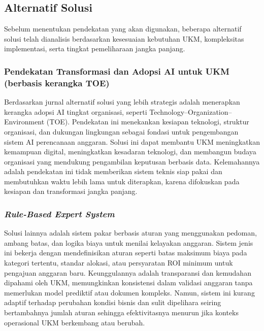 \subsection{Alternatif Solusi}
Sebelum menentukan pendekatan yang akan digunakan, beberapa alternatif solusi telah dianalisis berdasarkan kesesuaian kebutuhan UKM, kompleksitas implementasi, serta tingkat pemeliharaan jangka panjang.

\subsubsection{Pendekatan Transformasi dan Adopsi AI untuk UKM (berbasis kerangka TOE)}
Berdasarkan jurnal \textcite{Badghish2024} alternatif solusi yang lebih strategis adalah menerapkan kerangka adopsi AI tingkat organisasi, seperti Technology–Organization–Environment (TOE). Pendekatan ini menekankan kesiapan teknologi, struktur organisasi, dan dukungan lingkungan sebagai fondasi untuk pengembangan sistem AI perencanaan anggaran. Solusi ini dapat membantu UKM meningkatkan kemampuan digital, meningkatkan kesadaran teknologi, dan membangun budaya organisasi yang mendukung pengambilan keputusan berbasis data. Kelemahannya adalah pendekatan ini tidak memberikan sistem teknis siap pakai dan membutuhkan waktu lebih lama untuk diterapkan, karena difokuskan pada kesiapan dan transformasi jangka panjang.

\subsubsection{\textit{Rule-Based Expert System}}
Solusi lainnya adalah sistem pakar berbasis aturan yang menggunakan pedoman, ambang batas, dan logika biaya untuk menilai kelayakan anggaran. Sistem jenis ini bekerja dengan mendefinisikan aturan seperti batas maksimum biaya pada kategori tertentu, standar alokasi, atau persyaratan ROI minimum untuk pengajuan anggaran baru. Keunggulannya adalah transparansi dan kemudahan dipahami oleh UKM, memungkinkan konsistensi dalam validasi anggaran tanpa memerlukan model prediktif atau dokumen kompleks. Namun, sistem ini kurang adaptif terhadap perubahan kondisi bisnis dan sulit dipelihara seiring bertambahnya jumlah aturan sehingga efektivitasnya menurun jika konteks operasional UKM berkembang atau berubah.


